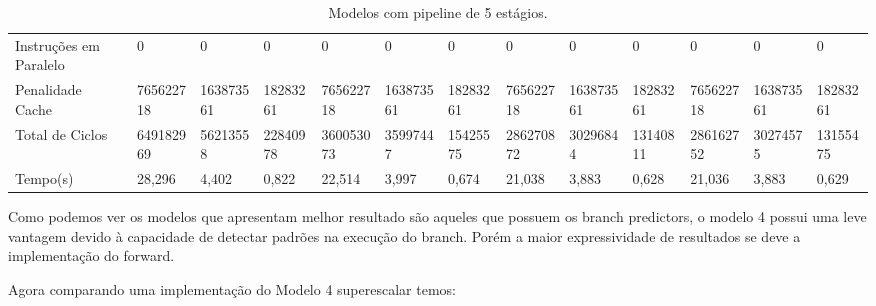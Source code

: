 \documentclass[pdftex,12pt,a4paper]{article}
\begin{document}
\begin{table}[H]
{\begin{tabular}{l|lll|lll|lll|lll|}
Instruções em Paralelo  & 0         & 0         & 0        & 0         & 0         & 0        & 0         & 0         & 0        & 0         & 0         & 0        \\
Penalidade Cache        & 765622718 & 163873561 & 18283261 & 765622718 & 163873561 & 18283261 & 765622718 & 163873561 & 18283261 & 765622718 & 163873561 & 18283261 \\ \hline \hline
Total de Ciclos         & 649182969 & 56213558  & 22840978 & 360053073 & 35997447  & 15425575 & 286270872 & 30296844  & 13140811 & 286162752 & 30274575  & 13155475   \\ \hline
Tempo(s)                & 28,296    & 4,402     & 0,822    & 22,514    & 3,997     & 0,674    & 21,038    & 3,883     & 0,628    & 21,036    & 3,883     & 0,629      \\ \hline 
\end{tabular}
}
\caption{Modelos com pipeline de 5 estágios.}
\label{tab3}
\end{table}

Como podemos ver os modelos que apresentam melhor resultado são aqueles que 
possuem os branch predictors, o modelo 4 possui uma leve vantagem devido à capacidade 
de detectar padrões na execução do branch. Porém a maior expressividade de resultados 
se deve a implementação do forward.

Agora comparando uma implementação do Modelo 4 superescalar temos:
\end{document}
